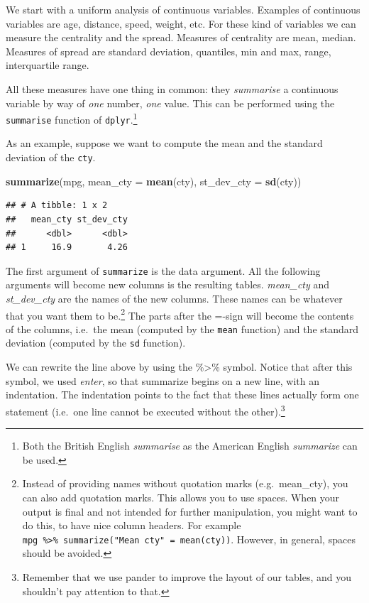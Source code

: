 \documentclass[]{tufte-book}
\newenvironment{Shaded}{}{}
\newcommand{\DataTypeTok}[1]{\textcolor[rgb]{0.56,0.13,0.00}{#1}}
\newcommand{\KeywordTok}[1]{\textcolor[rgb]{0.00,0.44,0.13}{\textbf{#1}}}
\newcommand{\NormalTok}[1]{#1}
\begin{document}
We start with a uniform analysis of continuous variables. Examples of continuous variables are age, distance, speed, weight, etc. For these kind of variables we can measure the centrality and the spread. Measures of centrality are mean, median. Measures of spread are standard deviation, quantiles, min and max, range, interquartile range.

All these measures have one thing in common: they \emph{summarise} a continuous variable by way of \emph{one} number, \emph{one} value. This can be performed using the \texttt{summarise} function of \texttt{dplyr}.\footnote{Both the British English \emph{summarise} as the American English \emph{summarize} can be used.}

As an example, suppose we want to compute the mean and the standard deviation of the \texttt{cty}.

\begin{Shaded}
\begin{Highlighting}[]
\KeywordTok{summarize}\NormalTok{(mpg, }\DataTypeTok{mean_cty =} \KeywordTok{mean}\NormalTok{(cty), }\DataTypeTok{st_dev_cty =} \KeywordTok{sd}\NormalTok{(cty))}
\end{Highlighting}
\end{Shaded}

\begin{verbatim}
## # A tibble: 1 x 2
##   mean_cty st_dev_cty
##      <dbl>      <dbl>
## 1     16.9       4.26
\end{verbatim}

The first argument of \texttt{summarize} is the data argument. All the following arguments will become new columns is the resulting tables. \emph{mean\_cty} and \emph{st\_dev\_cty} are the names of the new columns. These names can be whatever that you want them to be.\footnote{Instead of providing names without quotation marks (e.g.~mean\_cty), you can also add quotation marks. This allows you to use spaces. When your output is final and not intended for further manipulation, you might want to do this, to have nice column headers. For example \texttt{mpg\ \%\textgreater{}\%\ summarize("Mean\ cty"\ =\ mean(cty))}. However, in general, spaces should be avoided.} The parts after the =-sign will become the contents of the columns, i.e.~the mean (computed by the \texttt{mean} function) and the standard deviation (computed by the \texttt{sd} function).

We can rewrite the line above by using the \%\textgreater\% symbol. Notice that after this symbol, we used \emph{enter}, so that summarize begins on a new line, with an indentation. The indentation points to the fact that these lines actually form one statement (i.e.~one line cannot be executed without the other).\footnote{Remember that we use pander to improve the layout of our tables, and you shouldn't pay attention to that.}
\end{document}
